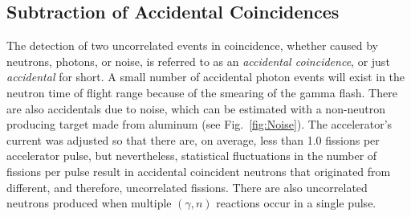 \documentclass[%
 reprint,
 amsmath,amssymb,
 aps,
 nofootinbib
]{revtex4-1}
\begin{document}
\subsection{Subtraction of Accidental Coincidences}
\label{Reconstruction of Accidental Coincidence}
The detection of two uncorrelated events in coincidence, whether caused by neutrons, photons, or noise, is referred to as an \emph{accidental coincidence}, or just \emph{accidental} for short.
A small number of accidental photon events will exist in the neutron time of flight range because of the smearing of the gamma flash.
There are also accidentals due to noise, which can be estimated with a non-neutron producing target made from aluminum (see Fig.~\ref{fig:Noise}).
The accelerator's current was adjusted so that there are, on average, less than 1.0 fissions per accelerator pulse, but nevertheless, statistical fluctuations in the number of fissions per pulse result in accidental coincident neutrons that originated from different, and therefore, uncorrelated fissions.
There are also uncorrelated neutrons produced when multiple $(\gamma, n)$ reactions occur in a single pulse.
\end{document}
